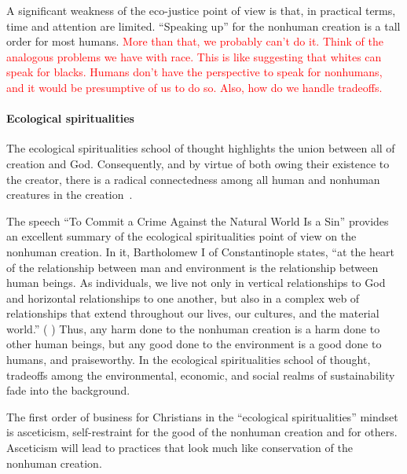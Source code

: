 \documentclass[12pt]{article}
\newcommand{\ins}[1]{\textcolor{red}{#1}}
\begin{document}
A significant weakness of the eco-justice point of view is that,
in practical terms, time and attention are limited.
``Speaking up'' for the nonhuman creation is a tall order for most humans.
\ins{More than that, we probably can't do it. Think of the analogous problems
we have with race. This is like suggesting that whites can speak for blacks. Humans
don't have the perspective to speak for nonhumans, and it would be presumptive of us
to do so. Also, how do we handle tradeoffs.}


\paragraph{Ecological spiritualities} 
\label{sec:ecological_spiritualities}

The ecological spiritualities school of thought 
highlights the union between all of creation and God.
Consequently, and by virtue of both owing their existence to the creator,
there is a radical connectedness among all human and nonhuman creatures 
in the creation~\autocite[93]{Jenkins:2008}.

The speech ``To Commit a Crime Against the Natural World Is a Sin'' 
\autocite[133-136]{Bartholomew-I-of-Constantinople:2011aa}
provides an excellent summary of the ecological spiritualities point of view
on the nonhuman creation.
In it, Bartholomew I of Constantinople states,
``at the heart of the relationship between man and environment 
is the relationship between human beings.
As individuals, we live not only in vertical relationships to God 
and horizontal relationships to one another, but 
also in a complex web of relationships that extend throughout
our lives, our cultures, and the material world.''
(\textcite{Bartholomew-I-of-Constantinople:2011aa} 
\textcite[133--134]{Bartholomew-I-of-Constantinople:2011aa})
Thus, any harm done to the nonhuman creation is a harm done to other human beings, but
any good done to the environment is a good done to humans, 
and praiseworthy. 
In the ecological spiritualities school of thought, 
tradeoffs among the environmental, economic, and social realms of sustainability
fade into the background. 

The first order of business for Christians in the ``ecological spiritualities'' mindset 
is asceticism, self-restraint for the good of the nonhuman creation and for others.
Asceticism will lead to practices that look much like conservation of the nonhuman creation.
\end{document}
